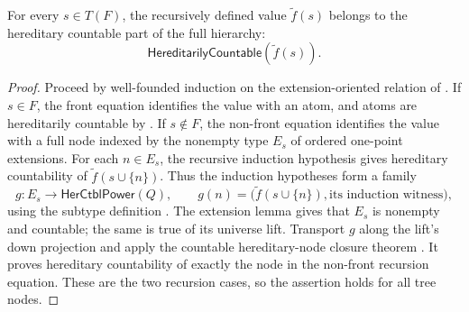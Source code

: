 \begin{lemma}
For every $s\in T(F)$, the recursively defined value
$\widetilde f(s)$ belongs to the hereditary countable part of the full
hierarchy:
\[
  \mathsf{HereditarilyCountable}(\widetilde f(s)).
\]
\end{lemma}
\begin{proof}
Proceed by well-founded induction on the extension-oriented relation of
.  If $s\in F$, the front equation
 identifies the value with an atom, and atoms
are hereditarily countable by .
If $s\notin F$, the non-front equation
 identifies the value with a full node
indexed by the nonempty type $E_s$ of ordered one-point extensions.  For
each $n\in E_s$, the recursive induction hypothesis gives hereditary
countability of $\widetilde f(s\cup\{n\})$.  Thus the induction hypotheses
form a family
\[
 g:E_s\longrightarrow\mathsf{HerCtblPower}(Q),\qquad
 g(n)=\bigl(\widetilde f(s\cup\{n\}),
             \text{its induction witness}\bigr),
\]
using the subtype definition .  The extension lemma
 gives that $E_s$ is nonempty and
countable; the same is true of its universe lift.  Transport $g$ along the
lift's down projection and apply the countable hereditary-node closure theorem
.  It proves hereditary countability of exactly
the node in the non-front recursion equation.  These are the two recursion
cases, so the assertion holds for all tree nodes.
\end{proof}
